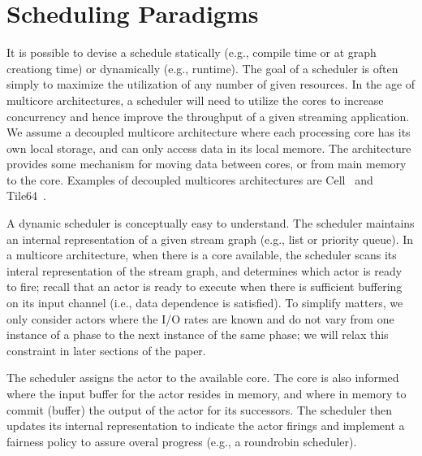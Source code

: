 \section{Scheduling Paradigms}


It is possible to devise a schedule statically (e.g.,  compile time or
at graph creationg time) or dynamically (e.g., runtime). The goal of a
scheduler is often simply to maximize the utilization of any number of
given resources. In the age of multicore architectures, a scheduler
will need to utilize the cores to increase concurrency and hence
improve the throughput of a given streaming application.
We assume a decoupled multicore architecture where each processing
core has its own local storage, and can only access data in its local
memore. The architecture provides some mechanism for moving data
between cores, or from main memory to the core. Examples of decoupled
multicores architectures are Cell~\cite{cell} and Tile64~\cite{tilera}.

A dynamic scheduler is conceptually easy to understand. The scheduler
maintains an internal representation of a given stream graph (e.g.,
list or priority queue). In a multicore architecture, when there is a
core available, the scheduler scans its interal representation of the
stream graph, and determines which actor is ready to fire; recall that
an actor is ready to execute when there is sufficient buffering on its
input channel (i.e., data dependence is satisfied).  To simplify
matters, we only consider actors where the I/O rates are known and do
not vary from one instance of a phase to the next instance of the same
phase; we will relax this constraint in later sections of the paper.

The scheduler assigns the actor to the available core. The core is
also informed where the input buffer for the actor resides in memory,
and where in memory to commit (buffer) the output of the actor for its
successors. The scheduler then updates its internal representation to
indicate the actor firings and implement a fairness policy to assure
overal progress (e.g., a roundrobin scheduler).

